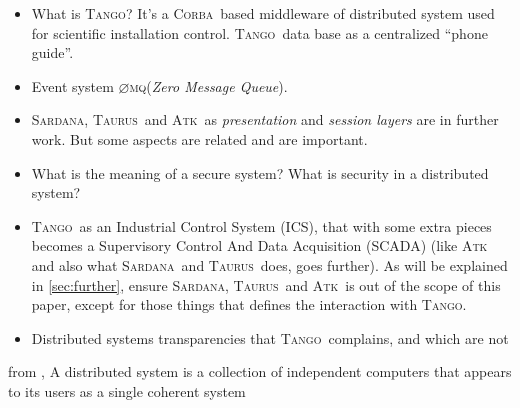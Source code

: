 \documentclass[10pt,a4paper,twoside]{llncs}
\newcommand{\tango}{\textsc{Tango}}
\newcommand{\sardana}{\textsc{Sardana}}
\newcommand{\taurus}{\textsc{Taurus}}
\newcommand{\atk}{\textsc{Atk}}
\newcommand{\zmq}{\textsc{$\varnothing$mq}}
\newcommand{\corba}{\textsc{Corba}}
\begin{document}
\begin{itemize}
 \item What is \tango? It's a \corba\, based middleware of distributed system used for scientific installation control. \tango\, data base as a centralized ``phone guide''.
 \item Event system \zmq (\emph{Zero Message Queue}).
 \item \sardana, \taurus\, and \atk\, as \emph{presentation} and \emph{session layers} are in further work. But some aspects are related and are important.
 \item What is the meaning of a secure system? What is security in a distributed system?
 \item \tango\, as an Industrial Control System (ICS), that with some extra pieces becomes a Supervisory Control And Data Acquisition (SCADA) (like \atk\, and also what \sardana\, and \taurus\, does, goes further). As will be explained in \ref{sec:further}, ensure \sardana, \taurus\, and \atk\, is out of the scope of this paper, except for those things that defines the interaction with \tango.
 \item Distributed systems transparencies \cite{TanenbaumDistr} that \tango\, complains, and which are not
\end{itemize}
  \begin{definition}
   from \cite{TanenbaumDistr}, A distributed system is a collection of independent computers that appears to its users as a single coherent system
  \end{definition}
  \begin{figure}[h]
  \end{figure}
\end{document}
